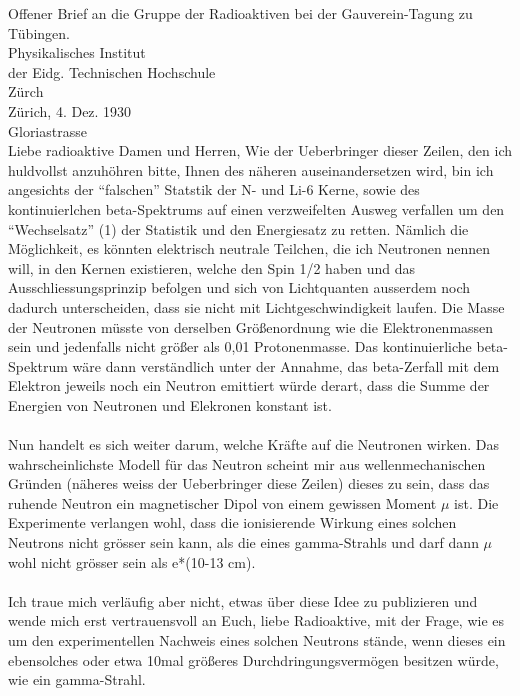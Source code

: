 Offener Brief an die Gruppe der Radioaktiven bei der Gauverein-Tagung zu Tübingen. \\
Physikalisches Institut \\
der Eidg. Technischen Hochschule\\
Zürch \\
Zürich, 4. Dez. 1930 \\
Gloriastrasse \\
Liebe radioaktive Damen und Herren, 
Wie der Ueberbringer dieser Zeilen, den ich huldvollst anzuhöhren bitte, 
Ihnen des näheren auseinandersetzen wird, bin ich angesichts der ``falschen'' 
Statstik der N- und Li-6 Kerne, sowie des kontinuierlchen beta-Spektrums auf 
einen verzweifelten Ausweg verfallen um den ``Wechselsatz'' (1) der Statistik 
und den Energiesatz zu retten. Nämlich die Möglichkeit, es könnten elektrisch 
neutrale Teilchen, die ich Neutronen nennen will, in den Kernen existieren, 
welche den Spin 1/2 haben und das Ausschliessungsprinzip befolgen und sich von 
Lichtquanten ausserdem noch dadurch unterscheiden, dass sie nicht mit Lichtgeschwindigkeit 
laufen. Die Masse der Neutronen müsste von derselben Größenordnung wie die Elektronenmassen
sein und jedenfalls nicht größer als 0,01 Protonenmasse. Das kontinuierliche beta-Spektrum 
wäre dann verständlich unter der Annahme, das beta-Zerfall mit dem Elektron jeweils noch 
ein Neutron emittiert würde derart, dass die Summe der Energien von Neutronen und Elekronen 
konstant ist. \\ \\
Nun handelt es sich weiter darum, welche Kräfte auf die Neutronen wirken. 
Das wahrscheinlichste Modell für das Neutron scheint mir aus wellenmechanischen Gründen 
(näheres weiss der Ueberbringer diese Zeilen) dieses zu sein, dass das ruhende Neutron ein 
magnetischer Dipol von einem gewissen Moment $\mu$ ist. Die Experimente verlangen wohl, 
dass die ionisierende Wirkung eines solchen Neutrons nicht grösser sein kann, 
als die eines gamma-Strahls und darf dann $\mu$ wohl nicht grösser sein als e*(10-13 cm). \\ \\
Ich traue mich verläufig aber nicht, etwas über diese Idee zu publizieren und wende mich 
erst vertrauensvoll an Euch, liebe Radioaktive, mit der Frage, wie es um den 
experimentellen Nachweis eines solchen Neutrons stände, wenn dieses ein ebensolches oder 
etwa 10mal größeres Durchdringungsvermögen besitzen würde, wie ein gamma-Strahl. \\ \\
